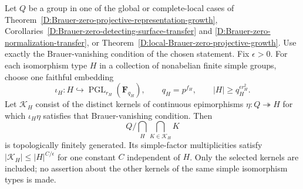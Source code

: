 \begin{corollary}
\label{D:Brauer-zero-selected-simple-product}
Let $Q$ be a group in one of the global or complete-local cases
of Theorem~\ref{D:Brauer-zero-projective-representation-growth},
Corollaries~\ref{D:Brauer-zero-detecting-surface-transfer} and
\ref{D:Brauer-zero-normalization-transfer}, or
Theorem~\ref{D:local-Brauer-zero-projective-growth}.
Use exactly the Brauer-vanishing condition of the chosen statement.
Fix $\epsilon>0$. For each isomorphism type $H$ in a collection
of nonabelian finite simple groups, choose one faithful embedding
\[
       \iota_H:H\hookrightarrow
                    \operatorname{PGL}_{r_H}(\mathbf F_{q_H}),
       \qquad q_H=p^{f_H},\qquad
                    |H|\ge q_H^{\epsilon r_H^2}.
\]
Let $\mathcal K_H$ consist of the distinct kernels of continuous
epimorphisms $\eta:Q\twoheadrightarrow H$ for which
$\iota_H\eta$ satisfies that Brauer-vanishing condition.
Then
\[
           Q\big/\bigcap_H\bigcap_{K\in\mathcal K_H}K
\]
is topologically finitely generated. Its simple-factor
multiplicities satisfy $|\mathcal K_H|\le |H|^{C/\epsilon}$
for one constant $C$ independent of $H$.
Only the selected kernels are included; no assertion about
the other kernels of the same simple isomorphism types is made.
\end{corollary}
